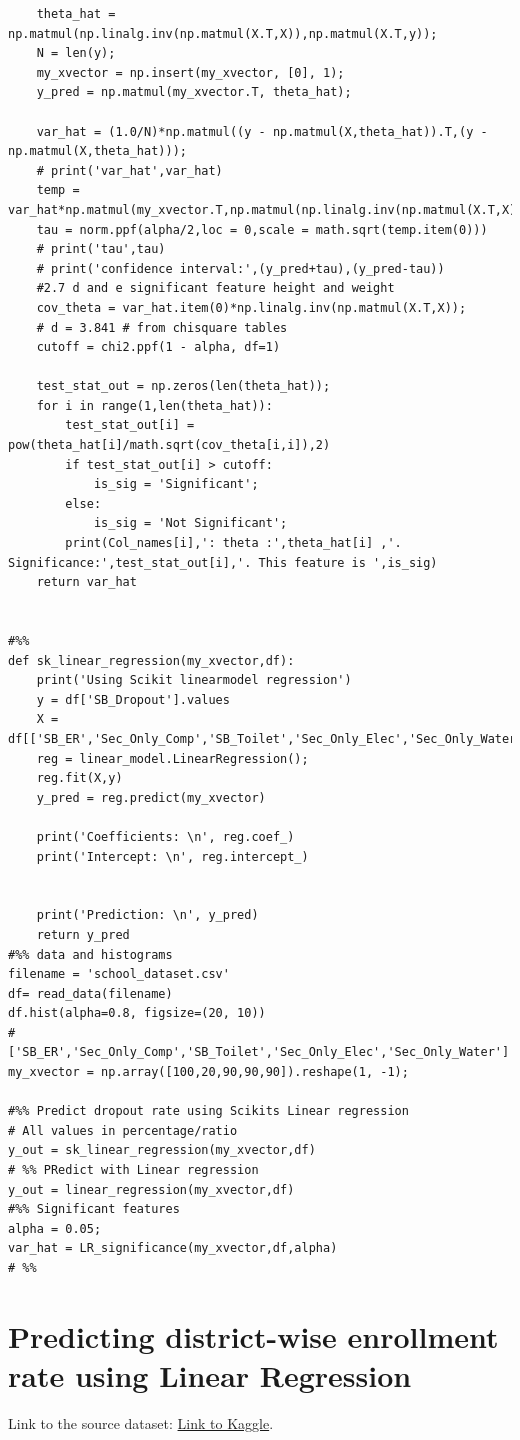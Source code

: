 \documentclass{article}
\begin{document}
\begin{appendices}
\begin{lstlisting}
    theta_hat = np.matmul(np.linalg.inv(np.matmul(X.T,X)),np.matmul(X.T,y));
    N = len(y);
    my_xvector = np.insert(my_xvector, [0], 1);
    y_pred = np.matmul(my_xvector.T, theta_hat);

    var_hat = (1.0/N)*np.matmul((y - np.matmul(X,theta_hat)).T,(y - np.matmul(X,theta_hat)));
    # print('var_hat',var_hat)
    temp = var_hat*np.matmul(my_xvector.T,np.matmul(np.linalg.inv(np.matmul(X.T,X)),my_xvector));
    tau = norm.ppf(alpha/2,loc = 0,scale = math.sqrt(temp.item(0)))
    # print('tau',tau)
    # print('confidence interval:',(y_pred+tau),(y_pred-tau))
    #2.7 d and e significant feature height and weight
    cov_theta = var_hat.item(0)*np.linalg.inv(np.matmul(X.T,X));
    # d = 3.841 # from chisquare tables
    cutoff = chi2.ppf(1 - alpha, df=1)

    test_stat_out = np.zeros(len(theta_hat));
    for i in range(1,len(theta_hat)):
        test_stat_out[i] = pow(theta_hat[i]/math.sqrt(cov_theta[i,i]),2)
        if test_stat_out[i] > cutoff:
            is_sig = 'Significant';
        else:
            is_sig = 'Not Significant';
        print(Col_names[i],': theta :',theta_hat[i] ,'. Significance:',test_stat_out[i],'. This feature is ',is_sig)
    return var_hat


#%%
def sk_linear_regression(my_xvector,df):
    print('Using Scikit linearmodel regression')
    y = df['SB_Dropout'].values
    X = df[['SB_ER','Sec_Only_Comp','SB_Toilet','Sec_Only_Elec','Sec_Only_Water']].values
    reg = linear_model.LinearRegression();
    reg.fit(X,y)
    y_pred = reg.predict(my_xvector)

    print('Coefficients: \n', reg.coef_)
    print('Intercept: \n', reg.intercept_)
    

    print('Prediction: \n', y_pred)
    return y_pred
#%% data and histograms
filename = 'school_dataset.csv'
df= read_data(filename)
df.hist(alpha=0.8, figsize=(20, 10))
# ['SB_ER','Sec_Only_Comp','SB_Toilet','Sec_Only_Elec','Sec_Only_Water']
my_xvector = np.array([100,20,90,90,90]).reshape(1, -1);

#%% Predict dropout rate using Scikits Linear regression
# All values in percentage/ratio
y_out = sk_linear_regression(my_xvector,df)
# %% PRedict with Linear regression
y_out = linear_regression(my_xvector,df)
#%% Significant features
alpha = 0.05;
var_hat = LR_significance(my_xvector,df,alpha)
# %%
\end{lstlisting}

\pagebreak
\section{Predicting district-wise enrollment rate using Linear Regression}
Link to the source dataset: \href{https://www.kaggle.com/rajanand/education-in-india}{Link to Kaggle}. 


\end{appendices}
\end{document}
